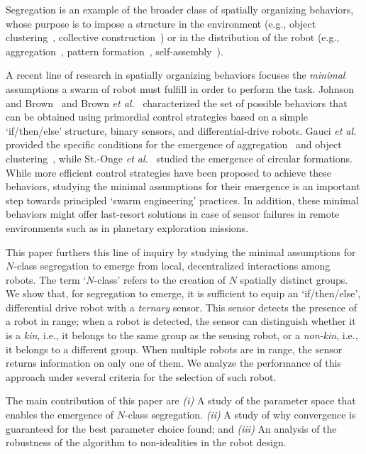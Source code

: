\documentclass[conference]{IEEEtran}
\begin{document}
Segregation is an example of the broader class of spatially organizing
behaviors, whose purpose is to impose a structure in the environment (e.g.,
object clustering~\cite{gauci_clustering_2014}, collective
construction~\cite{Bolger2010}) or in the distribution of the robot (e.g.,
aggregation~\cite{shlyakhov_survey_2017}, pattern
formation~\cite{Pinciroli:DARS2016}, self-assembly~\cite{gross2008self}).

A recent line of research in spatially organizing behaviors focuses the
\emph{minimal} assumptions a swarm of robot must fulfill in order to perform the
task. Johnson and Brown~\cite{johnson_evolving_2016} and Brown \emph{et
  al.}~\cite{brown_discovery_2018} characterized the set of possible behaviors
that can be obtained using primordial control strategies based on a simple
`if/then/else' structure, binary sensors, and differential-drive robots. Gauci
\emph{et al.} provided the specific conditions for the emergence of
aggregation~\cite{gauci_evolving_2014} and object
clustering~\cite{gauci_clustering_2014}, while St.-Onge \emph{et
  al.}~\cite{StOnge:IROS2018} studied the emergence of circular
formations. While more efficient control strategies have been proposed to
achieve these behaviors, studying the minimal assumptions for their emergence is
an important step towards principled `swarm engineering' practices. In addition,
these minimal behaviors might offer last-resort solutions in case of sensor
failures in remote environments such as in planetary exploration missions.

This paper furthers this line of inquiry by studying the minimal assumptions for
$N$-class segregation to emerge from local, decentralized interactions among
robots. The term `$N$-class' refers to the creation of $N$ spatially distinct
groups. We show that, for segregation to emerge, it is sufficient to equip an
`if/then/else', differential drive robot with a \emph{ternary} sensor. This
sensor detects the presence of a robot in range; when a robot is detected, the
sensor can distinguish whether it is a \emph{kin}, i.e., it belongs to the same
group as the sensing robot, or a \emph{non-kin}, i.e., it belongs to a different
group. When multiple robots are in range, the sensor returns information on only
one of them. We analyze the performance of this approach under several criteria
for the selection of such robot.

The main contribution of this paper are \emph{(i)} A study of the parameter
space that enables the emergence of $N$-class segregation. \emph{(ii)} A study
of why convergence is guaranteed for the best parameter choice found; and
\emph{(iii)} An analysis of the robustness of the algorithm to non-idealities in
the robot design.
\end{document}
